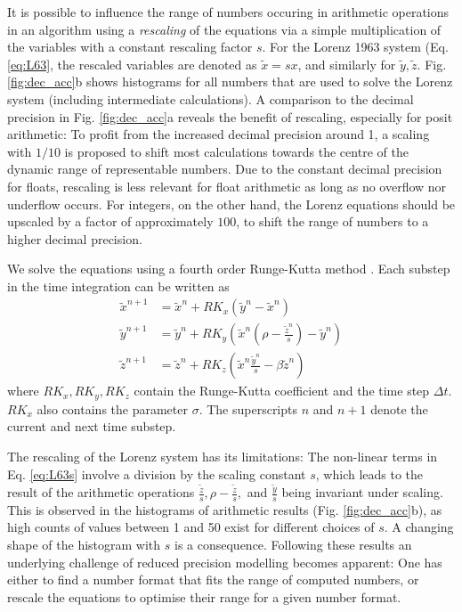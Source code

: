 \documentclass[draft]{agujournal2019}
\begin{document}
It is possible to influence the range of numbers occuring in arithmetic operations in an algorithm using a \emph{rescaling} of the equations via a simple multiplication of the variables with a constant rescaling factor $s$. For the Lorenz 1963 system (Eq. \ref{eq:L63}, the rescaled variables are denoted as $\tilde{x} = sx$, and similarly for $\tilde{y},\tilde{z}$. Fig. \ref{fig:dec_acc}b shows histograms for all numbers that are used to solve the Lorenz system (including intermediate calculations). A comparison to the decimal precision in Fig. \ref{fig:dec_acc}a reveals the benefit of rescaling, especially for posit arithmetic: To profit from the increased decimal precision around 1, a scaling with $1/10$ is proposed to shift most calculations towards the centre of the dynamic range of representable numbers. Due to the constant decimal precision for floats, rescaling is less relevant for float arithmetic as long as no overflow nor underflow occurs. For integers, on the other hand, the Lorenz equations should be upscaled by a factor of approximately $100$, to shift the range of numbers to a higher decimal precision.

We solve the equations using a fourth order Runge-Kutta method \cite{Butcher2016}. Each substep in the time integration can be written as 
\begin{subequations}
\begin{align}
\tilde{x}^{n+1} &= \tilde{x}^n + RK_x\left(\tilde{y}^n-\tilde{x}^n\right) \\
\tilde{y}^{n+1} &= \tilde{y}^n + RK_y\left(\tilde{x}^n(\rho - \frac{\tilde{z}^n}{s}) - \tilde{y}^n \right) \\
\tilde{z}^{n+1} &= \tilde{z}^n + RK_z\left(\tilde{x}^n\frac{\tilde{y}^n}{s} - \beta \tilde{z}^n\right)
\end{align}
\label{eq:L63s}%
\end{subequations}
where $RK_x,RK_y,RK_z$ contain the Runge-Kutta coefficient and the time step $\Delta t$.  $RK_x$ also contains the parameter $\sigma$. The superscripts $n$ and $n+1$ denote the current and next time substep.

The rescaling of the Lorenz system has its limitations: The non-linear terms in Eq. \ref{eq:L63s} involve a division by the scaling constant $s$, which leads to the result of the arithmetic operations $\tfrac{\tilde{z}}{s}, \rho - \tfrac{\tilde{z}}{s},$ and $\tfrac{\tilde{y}}{s}$ being invariant under scaling. This is observed in the histograms of arithmetic results (Fig. \ref{fig:dec_acc}b), as high counts of values between 1 and 50 exist for different choices of $s$. A changing shape of the histogram with $s$ is a consequence. Following these results an underlying challenge of reduced precision modelling becomes apparent: One has either to find a number format that fits the range of computed numbers, or rescale the equations to optimise their range for a given number format.
\end{document}
